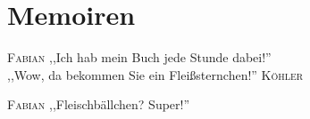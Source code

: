 \section{Memoiren}
\begin{multicols*}{2}
\setlength\columnseprule{.4pt}
\hangindent=0.7cm 
\raggedright \textsc{\footnotesize Fabian} ,,Ich hab mein Buch jede Stunde dabei!''\\
\raggedleft  ,,Wow, da bekommen Sie ein Fleißsternchen!'' \textsc{\footnotesize Köhler}\\
\raggedright \textsc{\footnotesize Fabian} ,,Fleischbällchen? Super!''\\
\end{multicols*}
